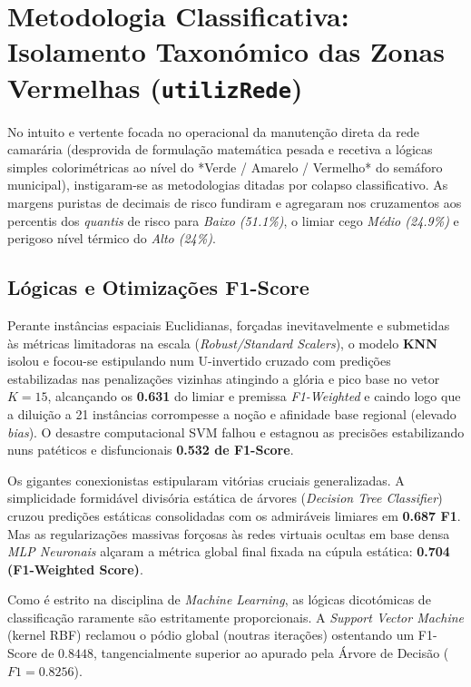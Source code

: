 \documentclass[conference]{IEEEtran}
\begin{document}
\section{Metodologia Classificativa: Isolamento Taxonómico das Zonas Vermelhas (\texttt{utilizRede})}
No intuito e vertente focada no operacional da manutenção direta da rede camarária (desprovida de formulação matemática pesada e recetiva a lógicas simples colorimétricas ao nível do *Verde / Amarelo / Vermelho* do semáforo municipal), instigaram-se as metodologias ditadas por colapso classificativo. As margens puristas de decimais de risco fundiram e agregaram nos cruzamentos aos percentis dos \textit{quantis} de risco para \textit{Baixo (51.1\%)}, o limiar cego \textit{Médio (24.9\%)} e perigoso nível térmico do \textit{Alto (24\%)}.

\subsection{Lógicas e Otimizações F1-Score}
Perante instâncias espaciais Euclidianas, forçadas inevitavelmente e submetidas às métricas limitadoras na escala (\textit{Robust/Standard Scalers}), o modelo \textbf{KNN} isolou e focou-se estipulando num U-invertido cruzado com predições estabilizadas nas penalizações vizinhas atingindo a glória e pico base no vetor \textbf{$K=15$}, alcançando os \textbf{0.631} do limiar e premissa \textit{F1-Weighted} e caindo logo que a diluição a 21 instâncias corrompesse a noção e afinidade base regional (elevado \textit{bias}).
O desastre computacional SVM falhou e estagnou as precisões estabilizando nuns patéticos e disfuncionais \textbf{0.532 de F1-Score}.

Os gigantes conexionistas estipularam vitórias cruciais generalizadas. A simplicidade formidável divisória estática de árvores (\textit{Decision Tree Classifier}) cruzou predições estáticas consolidadas com os admiráveis limiares em \textbf{0.687 F1}. Mas as regularizações massivas forçosas às redes virtuais ocultas em base densa \textit{MLP Neuronais} alçaram a métrica global final fixada na cúpula estática: \textbf{0.704 (F1-Weighted Score)}.

Como é estrito na disciplina de \textit{Machine Learning}, as lógicas dicotómicas de classificação raramente são estritamente proporcionais. A \textit{Support Vector Machine} (kernel RBF) reclamou o pódio global (noutras iterações) ostentando um F1-Score de $0.8448$, tangencialmente superior ao apurado pela Árvore de Decisão ($F1=0.8256$).
\end{document}
